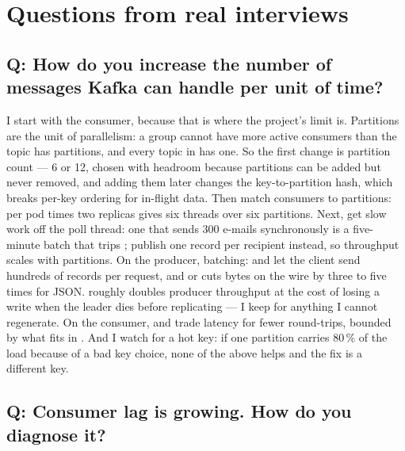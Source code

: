 \section{Questions from real interviews}

\subsection*{Q: How do you increase the number of messages Kafka can handle per unit of time?}

I start with the consumer, because that is where the project's limit
is. Partitions are the unit of parallelism: a group cannot have more
active consumers than the topic has partitions, and every topic in
 has one. So the first change is partition
count --- 6 or 12, chosen with headroom because partitions can be added
but never removed, and adding them later changes the key-to-partition
hash, which breaks per-key ordering for in-flight data. Then match
consumers to partitions:  per
pod times two replicas gives six threads over six partitions. Next,
get slow work off the poll thread: one  that
sends 300 e-mails synchronously is a five-minute batch that trips
; publish one record per recipient instead,
so throughput scales with partitions. On the producer, batching:
 and  let the client
send hundreds of records per request, and
 or  cuts bytes on the wire by
three to five times for JSON.  roughly doubles producer
throughput at the cost of losing a write when the leader dies before
replicating --- I keep  for anything I cannot
regenerate. On the consumer,  and
 trade latency for fewer round-trips, bounded by
what fits in . And I watch for a hot key:
if one partition carries 80\,\% of the load because of a bad key
choice, none of the above helps and the fix is a different key.

\subsection*{Q: Consumer lag is growing. How do you diagnose it?}

